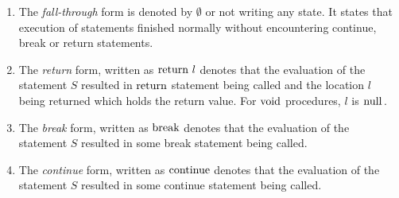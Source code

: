 \documentclass[a4paper, 10pt, draft]{report}
\newcommand{\mycode}[1]{\ensuremath{\mbox{\lstinline{#1}}}}
\begin{document}
\begin{enumerate}


  \item The \textit{fall-through} form is denoted by $\emptyset$ or not writing any
    state. It states that execution of statements finished normally without
    encountering continue, break or return statements.

  \item The \textit{return} form, written as $\mycode{return}\ l$ denotes that
    the evaluation of the statement $S$ resulted in \mycode{return} statement
    being called and the location $l$ being returned which holds the return
    value.  For \mycode{void} procedures, $l$ is \mycode{null}.

  \item The \textit{break} form, written as $\mycode{break}$ denotes that the
    evaluation of the statement $S$ resulted in some break statement being
    called.

  \item The \textit{continue} form, written as $\mycode{continue}$ denotes that the
    evaluation of the statement $S$ resulted in some continue statement being
    called.
\end{enumerate}
\end{document}
